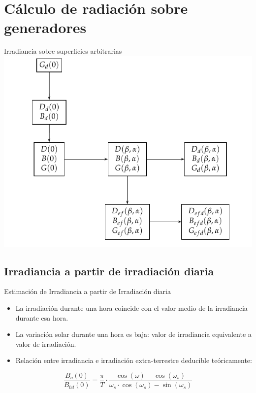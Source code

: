 \documentclass[xcolor={usenames,svgnames,dvipsnames}]{beamer}
\begin{document}
\section{Cálculo de radiación sobre generadores}
\label{sec-3}


\begin{frame}[label=sec-3-0-1]{Irradiancia sobre superficies arbitrarias}
\includegraphics[width=.9\linewidth]{../figs/ProcedimientoCalculoRadiacionInclinada.pdf}
\end{frame}

\subsection{Irradiancia a partir de irradiación diaria}
\label{sec-3-1}

\begin{frame}[label=sec-3-1-1]{Estimación de Irradiancia a partir de Irradiación diaria}
\begin{itemize}
\item La irradiación durante una hora coincide con el valor medio de la irradiancia durante esa hora.

\item La variación solar durante una hora es baja: valor de irradiancia equivalente a valor de irradiación.

\item Relación entre irradiancia e irradiación extra-terrestre deducible teóricamente:
\end{itemize}

\[\frac{B_{o}(0)}{B_{0d}(0)}=\frac{\pi}{T}\cdot\frac{\cos(\omega)-\cos(\omega_{s})}{\omega_{s}\cdot\cos(\omega_{s})-\sin(\omega_{s})}\]
\end{frame}
\end{document}
